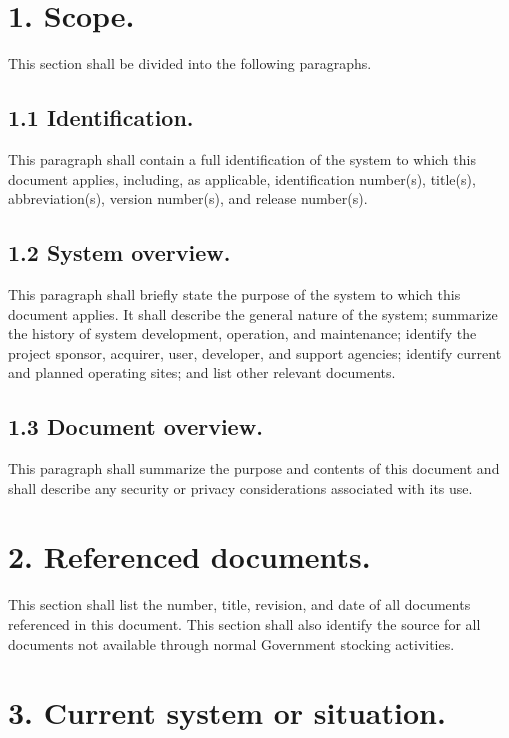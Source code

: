 \section{1. Scope.}

This section shall be divided into the following paragraphs.

\subsection{1.1 Identification.}

This paragraph shall contain a full identification of the system to
which this document applies, including, as applicable, identification
number(s), title(s), abbreviation(s), version number(s), and release
number(s).

\subsection{1.2 System overview.}

This paragraph shall briefly state the purpose of the system to which
this document applies. It shall describe the general nature of the
system; summarize the history of system development, operation, and
maintenance; identify the project sponsor, acquirer, user, developer,
and support agencies; identify current and planned operating sites; and
list other relevant documents.

\subsection{1.3 Document overview.}

This paragraph shall summarize the purpose and contents of this document
and shall describe any security or privacy considerations associated
with its use.

\section{2. Referenced documents.}

This section shall list the number, title, revision, and date of all
documents referenced in this document. This section shall also identify
the source for all documents not available through normal Government
stocking activities.

\section{3. Current system or situation.}

